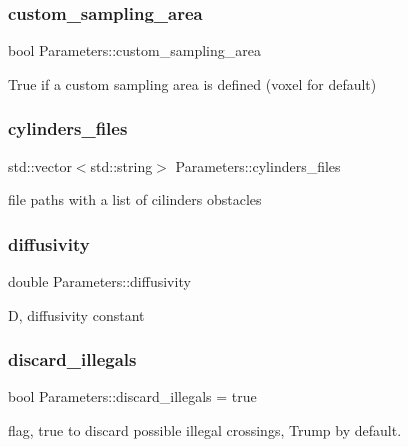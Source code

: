 \subsubsection{\texorpdfstring{custom\+\_\+sampling\+\_\+area}{custom\_sampling\_area}}
{\footnotesize\ttfamily bool Parameters\+::custom\+\_\+sampling\+\_\+area}

True if a custom sampling area is defined (voxel for default) \mbox{\label{class_parameters_abdef3b0fe62c5fdca7d417d01edd7422}} 
\subsubsection{\texorpdfstring{cylinders\+\_\+files}{cylinders\_files}}
{\footnotesize\ttfamily std\+::vector$<$std\+::string$>$ Parameters\+::cylinders\+\_\+files}

file paths with a list of cilinders obstacles \mbox{\label{class_parameters_add48efa1d9fe056fdb21fe2d2d92533d}} 
\subsubsection{\texorpdfstring{diffusivity}{diffusivity}}
{\footnotesize\ttfamily double Parameters\+::diffusivity}

D, diffusivity constant \mbox{\label{class_parameters_ac1a5fa4c00eaaf1b40789f329ae20e9a}} 
\subsubsection{\texorpdfstring{discard\+\_\+illegals}{discard\_illegals}}
{\footnotesize\ttfamily bool Parameters\+::discard\+\_\+illegals = true}

flag, true to discard possible illegal crossings, Trump by default. \mbox{\label{class_parameters_ab1815ac94d73ca8b56a9f12fca04cb89}} 
